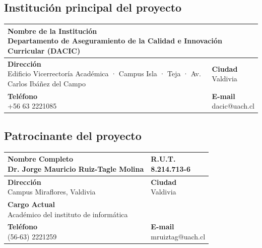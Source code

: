 \documentclass[12pt]{article}
\begin{document}
		\subsection{Institución principal del proyecto}
		\begin{large}
			\begin{tabular}{|l|l|}
				\hline
				
					\multicolumn{2}{|p{15cm}|}{ \parbox[t]{15cm}{ {\bf Nombre de la Institución} \\	 Departamento de Aseguramiento de la Calidad e Innovación Curricular (DACIC)}}\\ 
				\hline
				{ \parbox[t]{8cm}{ {\bf Dirección} \\Edificio Vicerrectoría Académica · Campus Isla · Teja · Av. Carlos Ibáñez del Campo}} & { \parbox[t]{8cm}{ {\bf Ciudad} \\	Valdivia}}
		\\ 
		
				\hline
				{ \parbox[t]{8cm}{ {\bf Teléfono} \\	+56 63 2221085}} & { \parbox[t]{8cm}{ {\bf E-mail} \\  dacic@uach.cl}}
		\\ 
		
				\hline

			\end{tabular}
		\end{large}




		\subsection{Patrocinante del proyecto}
		\begin{large}
			\begin{tabular}{|l|l|}
				\hline
				
			{ \parbox[t]{7cm}{ {\bf Nombre Completo} \\	Dr. Jorge Mauricio Ruiz-Tagle Molina}}& { \parbox[t]{7cm}{ {\bf R.U.T.} \\	8.214.713-6}}\\ 
				\hline
				{ \parbox[t]{8cm}{ {\bf Dirección} \\	Campus Miraflores, Valdivia}} & { \parbox[t]{8cm}{ {\bf Ciudad} \\	Valdivia}}
		\\ 
		\hline
							\multicolumn{2}{|p{15cm}|}{ \parbox[t]{15cm}{ {\bf Cargo Actual} \\Académico del instituto de informática}}\\ 
							
				\hline
				{ \parbox[t]{8cm}{ {\bf Teléfono} \\ (56-63) 2221259	}} & { \parbox[t]{8cm}{ {\bf E-mail} \\ mruiztag@uach.cl}}
		\\ 
		
				\hline

			\end{tabular}
		\end{large}
	
\end{document}
